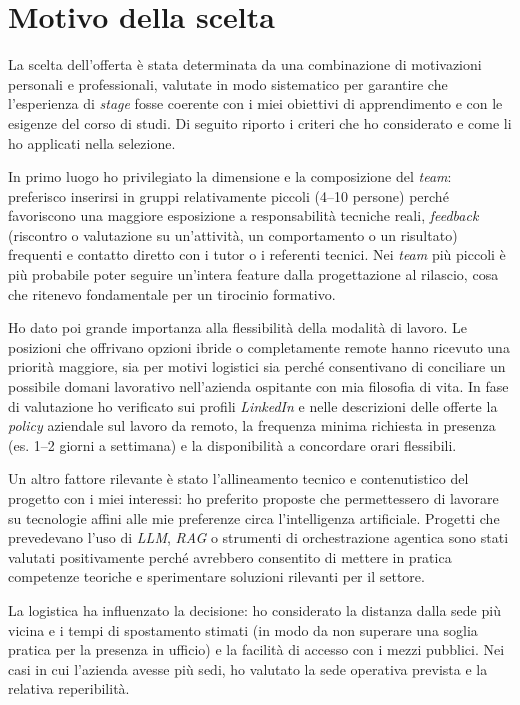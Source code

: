 \section{Motivo della scelta}

La scelta dell’offerta è stata determinata da una combinazione di motivazioni personali e professionali, valutate in modo sistematico per garantire che l’esperienza di \emph{stage} fosse 
coerente con i miei obiettivi di apprendimento e con le esigenze del corso di studi. 
Di seguito riporto i criteri che ho considerato e come li ho applicati nella selezione.

In primo luogo ho privilegiato la dimensione e la composizione del \emph{team}: preferisco inserirsi in gruppi relativamente piccoli (4–10 persone) perché favoriscono una maggiore 
esposizione a responsabilità tecniche reali, \emph{feedback} (riscontro o valutazione su un’attività, un comportamento o un risultato) frequenti e contatto diretto con i tutor o i referenti tecnici. 
Nei \emph{team} più piccoli è più probabile poter seguire 
un’intera feature dalla progettazione al rilascio, cosa che ritenevo fondamentale per un tirocinio formativo.

Ho dato poi grande importanza alla flessibilità della modalità di lavoro. 
Le posizioni che offrivano opzioni ibride o completamente remote hanno ricevuto una priorità maggiore, 
sia per motivi logistici sia perché consentivano di conciliare un possibile domani lavorativo nell'azienda ospitante con mia filosofia di vita. 
In fase di valutazione ho verificato sui profili \emph{LinkedIn} e nelle descrizioni delle 
offerte la \emph{policy} aziendale sul lavoro da remoto, la frequenza minima richiesta in presenza (es. 1–2 giorni a settimana) e la disponibilità a concordare orari flessibili.

Un altro fattore rilevante è stato l’allineamento tecnico e contenutistico del progetto con i miei interessi: ho preferito proposte che permettessero di lavorare su tecnologie 
affini alle mie preferenze circa l'intelligenza artificiale. 
Progetti che prevedevano l’uso di \emph{LLM}, \emph{RAG} o strumenti di orchestrazione agentica sono stati valutati positivamente perché avrebbero consentito di mettere in pratica competenze 
teoriche e sperimentare soluzioni rilevanti per il settore.

La logistica ha influenzato la decisione: ho considerato la distanza dalla sede più vicina e i tempi di spostamento stimati 
(in modo da non superare una soglia pratica per la presenza in ufficio) e la facilità di accesso con i mezzi pubblici. 
Nei casi in cui l’azienda avesse più sedi, ho valutato la sede operativa prevista e la relativa reperibilità.

